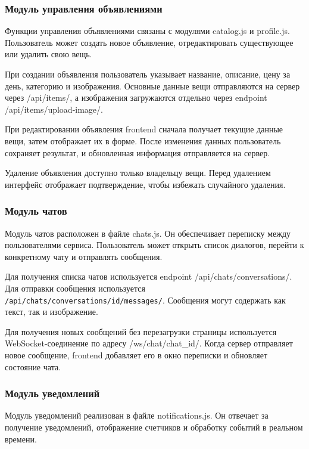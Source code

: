 \subsubsection{Модуль управления объявлениями}

Функции управления объявлениями связаны с модулями catalog.js и profile.js. Пользователь может создать новое объявление, отредактировать существующее или удалить свою вещь.

При создании объявления пользователь указывает название, описание, цену за день, категорию и изображения. Основные данные вещи отправляются на сервер через /api/items/, а изображения загружаются отдельно через endpoint /api/items/upload-image/.

При редактировании объявления frontend сначала получает текущие данные вещи, затем отображает их в форме. После изменения данных пользователь сохраняет результат, и обновленная информация отправляется на сервер.

Удаление объявления доступно только владельцу вещи. Перед удалением интерфейс отображает подтверждение, чтобы избежать случайного удаления.

\subsubsection{Модуль чатов}

Модуль чатов расположен в файле chats.js. Он обеспечивает переписку между пользователями сервиса. Пользователь может открыть список диалогов, перейти к конкретному чату и отправлять сообщения.

Для получения списка чатов используется endpoint /api/chats/conversations/. Для отправки сообщения используется \texttt{/api/chats/conversations/{id}/messages/}. Сообщения могут содержать как текст, так и изображение.

Для получения новых сообщений без перезагрузки страницы используется WebSocket-соединение по адресу /ws/chat/{chat\_id}/. Когда сервер отправляет новое сообщение, frontend добавляет его в окно переписки и обновляет состояние чата.

\subsubsection{Модуль уведомлений}

Модуль уведомлений реализован в файле notifications.js. Он отвечает за получение уведомлений, отображение счетчиков и обработку событий в реальном времени.

